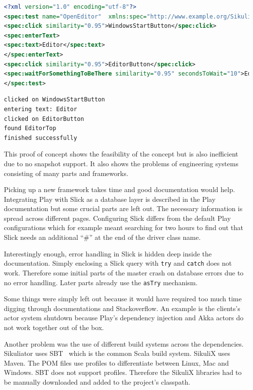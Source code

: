 \documentclass[a4paper,twocolumn,twoside]{article}
\newcommand{\Sik}[0]{Sikuliator}
\begin{document}
\begin{minipage}{\linewidth}
\begin{lstlisting}[language=XML,caption={Example test case specification},label={lst:EditorXML}]
<?xml version="1.0" encoding="utf-8"?>
<spec:test name="OpenEditor"  xmlns:spec="http://www.example.org/Sikuliator">
<spec:click similarity="0.95">WindowsStartButton</spec:click>
<spec:enterText>
<spec:text>Editor</spec:text>
</spec:enterText>
<spec:click similarity="0.95">EditorButton</spec:click>
<spec:waitForSomethingToBeThere similarity="0.95" secondsToWait="10">EditorTop</spec:waitForSomethingToBeThere>
</spec:test>
\end{lstlisting}
\end{minipage}
\begin{minipage}{\linewidth}
\begin{lstlisting}[caption={Sikuliator's output for the example test case},label={lst:EditorOutput}]
clicked on WindowsStartButton
entering text: Editor
clicked on EditorButton
found EditorTop
finished successfully
\end{lstlisting}
\end{minipage}
This proof of concept shows the feasibility of the concept but is also inefficient due to no snapshot support.
It also shows the problems of engineering systems consisting of many parts and frameworks.

Picking up a new framework takes time and good documentation would help.
Integrating Play with Slick as a database layer is described in the Play documentation but some crucial parts are left out.
The necessary information is spread across different pages.
Configuring Slick differs from the default Play configurations which for example meant searching for two hours to find out that Slick needs an additional \enquote{\#} at the end of the driver class name.

Interestingly enough, error handling in Slick is hidden deep inside the documentation.
Simply enclosing a Slick query with \texttt{try} and \texttt{catch} does not work.
Therefore some initial parts of the master crash on database errors due to no error handling.
Later parts already use the \texttt{asTry} mechanism.

Some things were simply left out because it would have required too much time digging through documentations and Stackoverflow. An example is the clients's actor system shutdown because Play's dependency injection and Akka actors do not work together out of the box.

Another problem was the use of different build systems across the dependencies.
\Sik{} uses SBT~\cite{SBT} which is the common Scala build system.
SikuliX uses Maven.
The POM files use profiles to differentiate between Linux, Mac and Windows.
SBT does not support profiles.
Therefore the SikuliX libraries had to be manually downloaded and added to the project's classpath.
\end{document}
